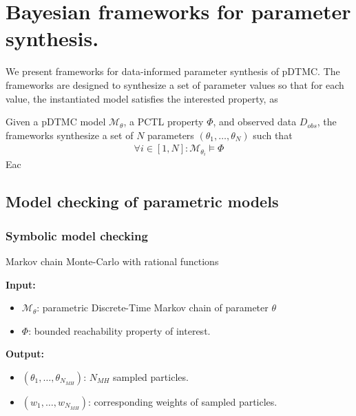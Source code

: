\chapter{Bayesian frameworks for parameter synthesis.}
We present frameworks for data-informed parameter synthesis of pDTMC. The frameworks are designed to
synthesize a set of parameter values so that for each value, the instantiated model satisfies the interested property, as

Given a pDTMC model $\mathcal{M}_\theta$, a PCTL property $\Phi$, and observed data $D_{obs}$, the
frameworks synthesize a set of $N$ parameters $(\theta_1,\ldots,\theta_N)$ such that
\begin{align*}
    \forall i \in [1,N]: \mathcal{M}_{\theta_i} \models \Phi
\end{align*}
Eac

\section{Model checking of parametric models}
\subsection{Symbolic model checking}
\begin{algorithm}[H]
    \caption{Markov chain Monte-Carlo with rational functions}
    \label{rf-mcmc-alg}
    \hspace*{\algorithmicindent} \textbf{Input:}
    \begin{itemize}
        \item $\mathcal{M}_\theta$: parametric Discrete-Time Markov chain of parameter $\theta$
        \item $\Phi$: bounded reachability property of interest.
    \end{itemize}
    \hspace*{\algorithmicindent} \textbf{Output:}
    \begin{itemize}
        \item $(\theta_1,\ldots,\theta_{N_{MH}})$: $N_{MH}$ sampled particles.
        \item $(w_1,\ldots,w_{N_{MH}})$: corresponding weights of sampled particles.
    \end{itemize}
    \begin{algorithmic}[1]

        \EndProcedure
    \end{algorithmic}
\end{algorithm}


